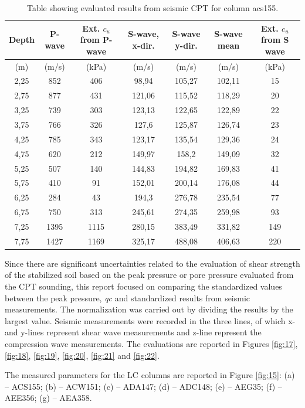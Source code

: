 \documentclass[final,3p,times,onecolumn,authoryear]{elsarticle}
\begin{document}
\begin{table}[t]
  \caption{Table showing evaluated results from seismic CPT for column acs155.}
  \centering
  \begin{tabular}{| c c c c c c c |}                         
    Depth & P-wave & Ext. $c_u$ from P-wave & S-wave, x-dir. & S-wave y-dir. & S-wave mean & Ext. $c_u$ from S wave \\ \hline 
    (m) & (m/s) & (kPa) & (m/s) & (m/s) & (m/s) & (kPa) \\ \hline
    2,25 & 852 & 406 & 98,94 & 105,27 & 102,11 & 15 \\
    2,75 & 877 & 431 & 121,06 & 115,52 & 118,29 & 20 \\
    3,25 & 739 & 303 & 123,13 & 122,65 & 122,89 & 22 \\
    3,75 & 766 & 326 & 127,6 & 125,87 & 126,74 & 23 \\
    4,25 & 785 & 343 & 123,17 & 135,54 & 129,36 & 24 \\
    4,75 & 620 & 212 & 149,97 & 158,2 & 149,09 & 32 \\
    5,25 & 507 & 140 & 144,83 & 194,82 & 169,83 & 41 \\
    5,75 & 410 & 91 & 152,01 & 200,14 & 176,08 & 44 \\
    6,25 & 284 & 43 & 194,3 & 276,78 & 235,54 & 77 \\
    6,75 & 750 & 313 & 245,61 & 274,35 & 259,98 & 93 \\
    7,25 & 1395 & 1115 & 280,15 & 383,49 & 331,82 & 149 \\
    7,75 & 1427 & 1169 & 325,17 & 488,08 & 406,63 & 220
  \end{tabular}
  \label{tab:2}
\end{table}


Since there are significant uncertainties related to the evaluation of shear strength of the stabilized soil based on the peak pressure or pore pressure evaluated from the CPT sounding, this report focused on comparing the standardized values between the peak pressure, \emph{qc} and standardized results from seismic measurements. The normalization was carried out by dividing the results by the largest value. Seismic measurements were recorded in the three lines, of which x- and y-lines represent shear wave measurements and z-line represent the compression wave measurements. The evaluations are reported in Figures \ref{fig:17}, \ref{fig:18}, \ref{fig:19}, \ref{fig:20}, \ref{fig:21} and \ref{fig:22}.  

The measured parameters for the LC columns are reported in Figure \ref{fig:15}: (a) -- ACS155; (b) -- ACW151; (c) -- ADA147; (d) -- ADC148; (e) -- AEG35; (f) -- AEE356; (g) -- AEA358.
\end{document}
